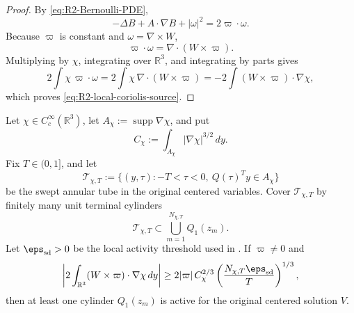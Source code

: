 \begin{proof}
By \eqref{eq:R2-Bernoulli-PDE},
\[
   -\Delta B+A\cdot\nabla B+|\omega|^2=2\varpi\cdot\omega .
\]
Because \(\varpi\) is constant and \(\omega=\nabla\times W\),
\[
   \varpi\cdot\omega
   =
   \nabla\cdot(W\times\varpi).
\]
Multiplying by \(\chi\), integrating over \(\mathbb R^3\), and integrating by
parts gives
\[
   2\int\chi\,\varpi\cdot\omega
   =
   2\int\chi\,\nabla\cdot(W\times\varpi)
   =
   -2\int(W\times\varpi)\cdot\nabla\chi ,
\]
which proves \eqref{eq:R2-local-coriolis-source}.
\end{proof}

\begin{lemma}
\label{lem:R2-annular-flux-active-concentration}
Let \(\chi\in C_c^\infty(\mathbb R^3)\), let
\(A_\chi:=\operatorname{supp}\nabla\chi\), and put
\[
   C_\chi:=\int_{A_\chi}|\nabla\chi|^{3/2}\,dy .
\]
Fix \(T\in(0,1]\), and let
\[
   \mathcal T_{\chi,T}
   :=
   \{(y,\tau): -T<\tau<0,\ Q(\tau)^Ty\in A_\chi\}
\]
be the swept annular tube in the original centered variables.  Cover
\(\mathcal T_{\chi,T}\) by finitely many unit terminal cylinders
\[
   \mathcal T_{\chi,T}\subset \bigcup_{m=1}^{N_{\chi,T}}Q_1(z_m).
\]
Let \(\eps_{\rm sd}>0\) be the local activity threshold used in
.  If \(\varpi\ne0\) and
\begin{equation}\label{eq:R2-flux-active-threshold}
   \left|
      2\int_{\mathbb R^3}(W\times\varpi)\cdot\nabla\chi\,dy
   \right|
   \ge
   2|\varpi|\,C_\chi^{2/3}
      \left(\frac{N_{\chi,T}\eps_{\rm sd}}{T}\right)^{1/3},
\end{equation}
then at least one cylinder \(Q_1(z_m)\) is active for the original
centered solution \(V\).
\end{lemma}


